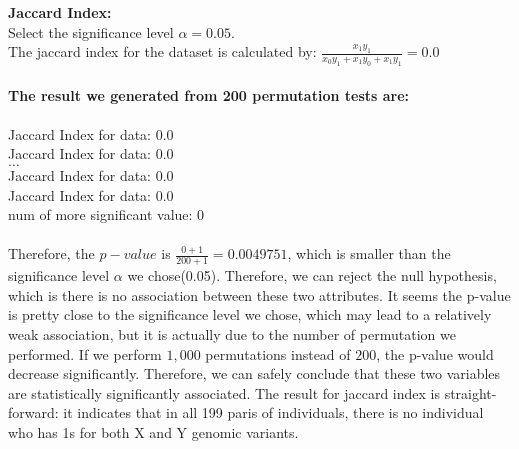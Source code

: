 \documentclass[12pt]{article}
\begin{document}
\noindent\textbf{Jaccard Index: } \\
Select the significance level $\alpha = 0.05$. \\
The jaccard index for the dataset is calculated by: $\frac{x_1y_1}{x_0y_1 + x_1y_0 + x_1y_1} = 0.0$ \\ \\
\textbf{The result we generated from 200 permutation tests are: } \\ \\
Jaccard Index for data:  0.0 \\
Jaccard Index for data:  0.0 \\
$\dots$ \\
Jaccard Index for data:  0.0 \\
Jaccard Index for data:  0.0 \\
num of more significant value:  0 \\ \\
Therefore, the $p-value$ is $\frac{0+1}{200+1} = 0.0049751$, which is smaller than the significance level $\alpha$ we chose(0.05). Therefore, we can reject the null hypothesis, which is there is no association between these two attributes.
It seems the p-value is pretty close to the significance level we chose, which may lead to a relatively weak association, but it is actually due to the number of permutation we performed. If we perform $1,000$ permutations instead of $200$, the
p-value would decrease significantly. Therefore, we can safely conclude that these two variables are statistically significantly associated.
The result for jaccard index is straight-forward: it indicates that in all 199 paris of individuals, there is no individual who has
1s for both X and Y genomic variants. \\
\end{document}
